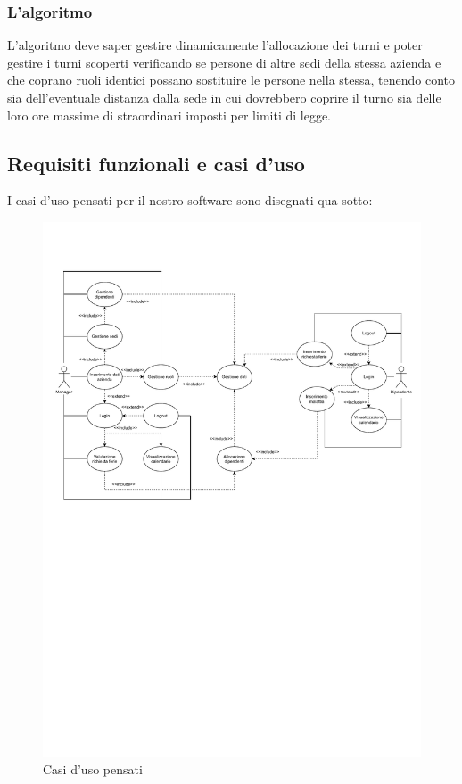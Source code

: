 \documentclass{article}
\begin{document}
\subsubsection{L'algoritmo}
L'algoritmo deve saper gestire dinamicamente l'allocazione dei turni e poter gestire i turni scoperti verificando se persone di altre sedi della stessa azienda e che coprano ruoli identici possano sostituire le persone nella stessa, tenendo conto sia dell'eventuale distanza dalla sede in cui dovrebbero coprire il turno sia delle loro ore massime di straordinari imposti per limiti di legge.
\subsection{Requisiti funzionali e casi d'uso}
I casi d'uso pensati per il nostro software sono disegnati qua sotto:
\begin{figure}[H]
  \centering
  \includegraphics[angle=90,origin=c,width=\paperwidth]{UseCase.pdf}
  \caption{Casi d'uso pensati}
\end{figure}
\end{document}
